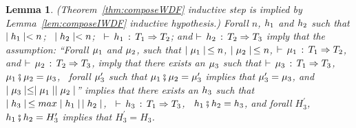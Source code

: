 \documentclass[acmtog, authorversion, acmlarge]{acmart}
\newtheorem{lem}{Lemma}
\begin{document}
\begin{lem}
  \label{lem:thm:help}
  (Theorem~\ref{thm:composeWDF} inductive step is implied by Lemma~\ref{lem:composeIWDF} inductive hypothesis.)
  Forall $n$, $h_1$ and $h_2$ such that\;
  $\mid h_1 \mid < n$;
  \, $\mid h_2 \mid < n$; \,
  $\vdash \, h_1 \, : \, T_1 \Rightarrow T_2$;
  and $\vdash \, h_2 \, : \, T_2 \Rightarrow T_3$ imply that the assumption:
  ``Forall $\mu_1$ and $\mu_2$, such that
  $\mid \mu_1 \mid \, \le n$, \; $\mid \mu_2 \mid \, \le n$, \;
  $\vdash \, \mu_1 \, : \, T_1 \Rightarrow T_2$, and $\vdash \, \mu_2 \, : \, T_2 \Rightarrow T_3$,
  imply that there exists an $\mu_3$ such that
  $\vdash \, \mu_3 \, : \, T_1 \Rightarrow T_3$, \,
  $\mu_1 \fatsemi \mu_2 = \mu_3$, \,
  forall $\mu_{3}^{\prime}$ such that
  $\mu_1 \fatsemi \mu_2 = \mu_{3}^{\prime}$
  implies that $\mu_{3}^{\prime} = \mu_{3}$,
  and $\mid \mu_3 \mid \le \mid \mu_1 \mid \mid \mu_2 \mid$''
  implies that there exists an $h_3$ such that
  $\mid h_3 \mid \, \le max \mid h_1 \mid \, \mid h_2 \mid$, \,
  $\vdash \, h_3 \, : \, T_1 \Rightarrow T_3$, \, $h_1 \fatsemi h_2 = h_3$, and
  forall $H_{3}^{\prime}$, \; $h_1 \fatsemi h_2 = H_{3}^{\prime}$
  implies that $H_{3}^{\prime} = H_{3}$.
\end{lem}
\end{document}
